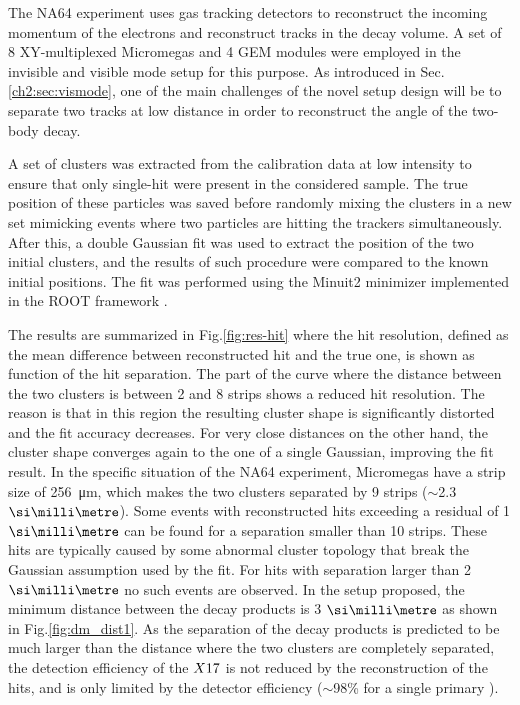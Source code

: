 The NA64 experiment uses gas tracking detectors to reconstruct the incoming momentum of the electrons and reconstruct tracks in the decay volume. A set of 8 XY-multiplexed Micromegas and 4 GEM modules were employed in the invisible and visible mode setup for this purpose. As introduced in Sec.\ref{ch2:sec:vismode}, one of the main challenges of the novel setup design will be to separate two tracks at low distance in order to reconstruct the angle of the two-body decay.

A set of clusters was extracted from the calibration data at low intensity to ensure that only single-hit were present in the considered sample. The true position of these particles was saved before randomly mixing the clusters in a new set mimicking events where two particles are hitting the trackers simultaneously. After this, a double Gaussian fit was used to extract the position of the two initial clusters, and the results of such procedure were compared to the known initial positions. The fit was performed using the Minuit2 minimizer implemented in the ROOT framework \cite{root}.

The results are summarized in Fig.\ref{fig:res-hit} where the hit resolution, defined as the mean difference between reconstructed hit and the true one, is shown as function of the hit separation. The part of the curve where the distance between the two clusters is between 2 and 8 strips shows a reduced hit resolution. The reason is that in this region the resulting cluster shape is significantly distorted and the fit accuracy decreases. For very close distances on the other hand, the cluster shape converges again to the one of a single Gaussian, improving the fit result. In the specific situation of the NA64 experiment, Micromegas have a strip size of \SI{256}{\micro\meter}, which makes the two clusters separated by 9 strips ($\sim$2.3 $\mmi$). Some events with reconstructed hits exceeding a residual of 1 $\mmi$ can be found for a separation smaller than 10 strips. These hits are typically caused by some abnormal cluster topology that break the Gaussian assumption used by the fit. For hits with separation larger than 2 $\mmi$ no such events are observed. In the setup proposed, the minimum distance between the decay products is 3 $\mmi$ as shown in Fig.\ref{fig:dm_dist1}. As the separation of the decay products is predicted to be much larger than the distance where the two clusters are completely separated, the detection efficiency of the $X17$ is not reduced by the reconstruction of the hits, and is only limited by the detector efficiency ($\sim$98\% for a single primary \cite{Banerjee:2017mdu}).

